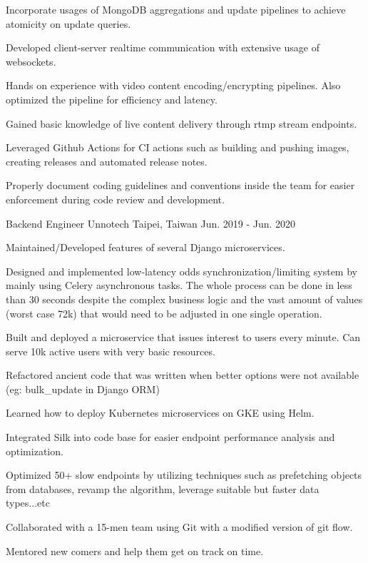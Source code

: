 \begin{cventries}
{\begin{cvitems}
        \item {Incorporate usages of MongoDB aggregations and update pipelines to achieve atomicity on update queries. }
        \item {Developed client-server realtime communication with extensive usage of websockets. }
        \item {Hands on experience with video content encoding/encrypting pipelines. Also optimized the pipeline for efficiency and latency. }
        \item {Gained basic knowledge of live content delivery through rtmp stream endpoints.}
        \item {Leveraged Github Actions for CI actions such as building and pushing images, creating releases and automated release notes.}
        \item {Properly document coding guidelines and conventions inside the team for easier enforcement during code review and development. }
      \end{cvitems}
    }

  \cventry
    {Backend Engineer} %
    {Unnotech} %
    {Taipei, Taiwan} %
    {Jun. 2019 - Jun. 2020} %
    {
      \begin{cvitems} %
        \item {Maintained/Developed features of several Django microservices. }
        \item {Designed and implemented low-latency odds synchronization/limiting system by mainly using Celery asynchronous tasks. The whole process can be done in less than 30 seconds despite the complex business logic and the vast amount of values (worst case 72k) that would need to be adjusted in one single operation. }
        \item {Built and deployed a microservice that issues interest to users every minute. Can serve 10k active users with very basic resources. }
        \item {Refactored ancient code that was written when better options were not available (eg: bulk\_update in Django ORM)}
        \item {Learned how to deploy Kubernetes microservices on GKE using Helm. }
        \item {Integrated Silk into code base for easier endpoint performance analysis and optimization. }
        \item {Optimized 50+ slow endpoints by utilizing techniques such as prefetching objects from databases, revamp the algorithm, leverage suitable but faster data types...etc }
        \item {Collaborated with a 15-men team using Git with a modified version of git flow. }
        \item {Mentored new comers and help them get on track on time. }
      \end{cvitems}
    }


\end{cventries}
